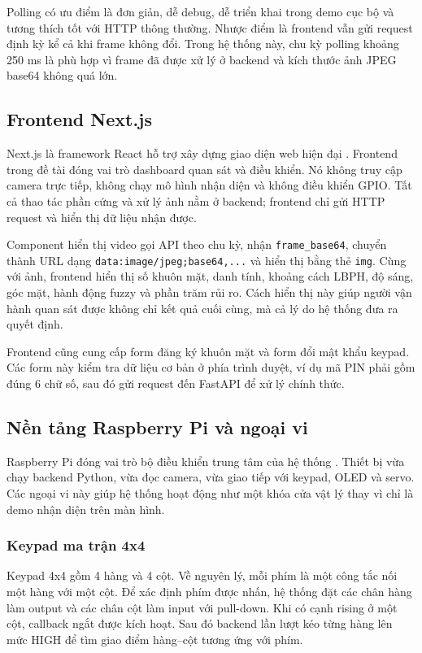 Polling có ưu điểm là đơn giản, dễ debug, dễ triển khai trong demo cục bộ và tương thích tốt với HTTP thông thường. Nhược điểm là frontend vẫn gửi request định kỳ kể cả khi frame không đổi. Trong hệ thống này, chu kỳ polling khoảng 250 ms là phù hợp vì frame đã được xử lý ở backend và kích thước ảnh JPEG base64 không quá lớn.

\subsection{Frontend Next.js}

Next.js là framework React hỗ trợ xây dựng giao diện web hiện đại \cite{nextjs}. Frontend trong đề tài đóng vai trò dashboard quan sát và điều khiển. Nó không truy cập camera trực tiếp, không chạy mô hình nhận diện và không điều khiển GPIO. Tất cả thao tác phần cứng và xử lý ảnh nằm ở backend; frontend chỉ gửi HTTP request và hiển thị dữ liệu nhận được.

Component hiển thị video gọi API theo chu kỳ, nhận \texttt{frame\_base64}, chuyển thành URL dạng \texttt{data:image/jpeg;base64,...} và hiển thị bằng thẻ \texttt{img}. Cùng với ảnh, frontend hiển thị số khuôn mặt, danh tính, khoảng cách LBPH, độ sáng, góc mặt, hành động fuzzy và phần trăm rủi ro. Cách hiển thị này giúp người vận hành quan sát được không chỉ kết quả cuối cùng, mà cả lý do hệ thống đưa ra quyết định.

Frontend cũng cung cấp form đăng ký khuôn mặt và form đổi mật khẩu keypad. Các form này kiểm tra dữ liệu cơ bản ở phía trình duyệt, ví dụ mã PIN phải gồm đúng 6 chữ số, sau đó gửi request đến FastAPI để xử lý chính thức.

\subsection{Nền tảng Raspberry Pi và ngoại vi}

Raspberry Pi đóng vai trò bộ điều khiển trung tâm của hệ thống \cite{raspberrypi}. Thiết bị vừa chạy backend Python, vừa đọc camera, vừa giao tiếp với keypad, OLED và servo. Các ngoại vi này giúp hệ thống hoạt động như một khóa cửa vật lý thay vì chỉ là demo nhận diện trên màn hình.

\subsubsection{Keypad ma trận 4x4}

Keypad 4x4 gồm 4 hàng và 4 cột. Về nguyên lý, mỗi phím là một công tắc nối một hàng với một cột. Để xác định phím được nhấn, hệ thống đặt các chân hàng làm output và các chân cột làm input với pull-down. Khi có cạnh rising ở một cột, callback ngắt được kích hoạt. Sau đó backend lần lượt kéo từng hàng lên mức HIGH để tìm giao điểm hàng--cột tương ứng với phím.

